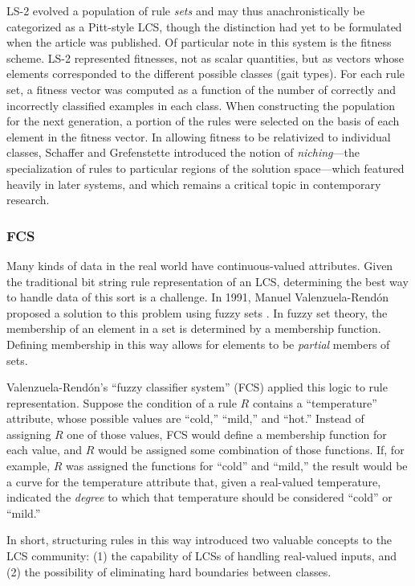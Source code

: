 \documentclass[11pt]{article}
\begin{document}
LS-2 evolved a population of rule \emph{sets} and may thus anachronistically be categorized as a Pitt-style LCS, though the distinction had yet to be formulated when the article was published. Of particular note in this system is the fitness scheme. LS-2 represented fitnesses, not as scalar quantities, but as vectors whose elements corresponded to the different possible classes (gait types). For each rule set, a fitness vector was computed as a function of the number of correctly and incorrectly classified examples in each class. When constructing the population for the next generation, a portion of the rules were selected on the basis of each element in the fitness vector. In allowing fitness to be relativized to individual classes, Schaffer and Grefenstette introduced the notion of \emph{niching}---the specialization of rules to particular regions of the solution space---which  featured heavily in later systems, and which remains a critical topic in contemporary research.

\subsubsection{FCS}

Many kinds of data in the real world have continuous-valued attributes. Given the traditional bit string rule representation of an LCS, determining the best way to handle data of this sort is a challenge. In 1991, Manuel Valenzuela-Rend\'on proposed a solution to this problem using fuzzy sets \cite{manuel_valenzuela-rendon_fuzzy_1991}. In fuzzy set theory, the membership of an element in a set is determined by a membership function. Defining membership in this way allows for elements to be \emph{partial} members of sets.

Valenzuela-Rend\'on's ``fuzzy classifier system'' (FCS) applied this logic to rule representation. Suppose the condition of a rule $R$ contains a ``temperature'' attribute, whose possible values are ``cold,'' ``mild,'' and ``hot.'' Instead of assigning $R$ one of those values, FCS would define a membership function for each value, and $R$ would be assigned some combination of those functions. If, for example, $R$ was assigned the functions for ``cold'' and ``mild,'' the result would be a curve for the temperature attribute that, given a real-valued temperature, indicated the \emph{degree} to which that temperature should be considered ``cold'' or ``mild.''

In short, structuring rules in this way introduced two valuable concepts to the LCS community: (1) the capability of LCSs of handling real-valued inputs, and (2) the possibility of eliminating hard boundaries between classes.
\end{document}
